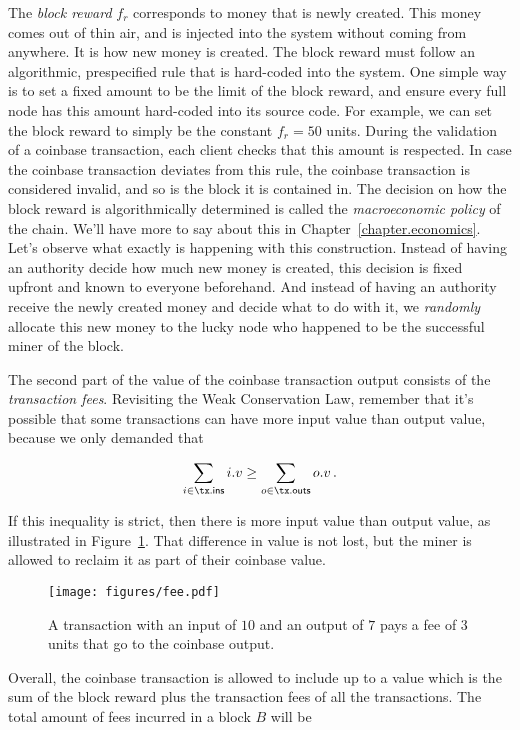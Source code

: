 The \emph{block reward} $f_r$ corresponds
to money that is newly created. This money comes out of thin air, and is injected into the system
without coming from anywhere. It is how new money is created. The block reward must follow an
algorithmic, prespecified rule that is hard-coded into the system. One simple way is to set a fixed
amount to be the limit of the block reward, and ensure every full node has this amount hard-coded
into its source code. For example, we can set the block reward to simply be the constant $f_r = 50$ units.
During the validation of a coinbase transaction, each client checks that this
amount is respected. In case the coinbase transaction deviates from this rule, the coinbase transaction
is considered invalid, and so is the block it is contained in. The decision on how the block reward
is algorithmically determined is called the \emph{macroeconomic policy} of the chain. We'll have
more to say about this in Chapter~\ref{chapter.economics}. Let's observe what exactly is happening
with this construction. Instead of having an authority decide how much new money is created, this
decision is fixed upfront and known to everyone beforehand. And instead of having an authority
receive the newly created money and decide what to do with it, we \emph{randomly} allocate this
new money to the lucky node who happened to be the successful miner of the block.

The second part of the value of the coinbase transaction output consists of the \emph{transaction fees}.
Revisiting the Weak Conservation Law, remember that it's possible that some transactions can have
more input value than output value, because we only demanded that

\[
    \sum_{i \in \tx\textsf{.ins}} i.v \geq \sum_{o \in \tx\textsf{.outs}} o.v\,.
\]

If this inequality is strict, then there is more input value than output value, as illustrated
in Figure~\ref{fig.fee}. That difference in value
is not lost, but the miner is allowed to reclaim it as part of their coinbase value.

\begin{figure}[h]
    \centering
    \texttt{[image: figures/fee.pdf]}
    \caption{A transaction with an input of $10$ and an output of $7$ pays a fee of $3$ units that
             go to the coinbase output.}
    \label{fig.fee}
\end{figure}

Overall, the coinbase transaction is allowed to include up to a value which is the sum of
the block reward plus the transaction fees of all the transactions. The total amount of fees
incurred in a block $B$ will be

